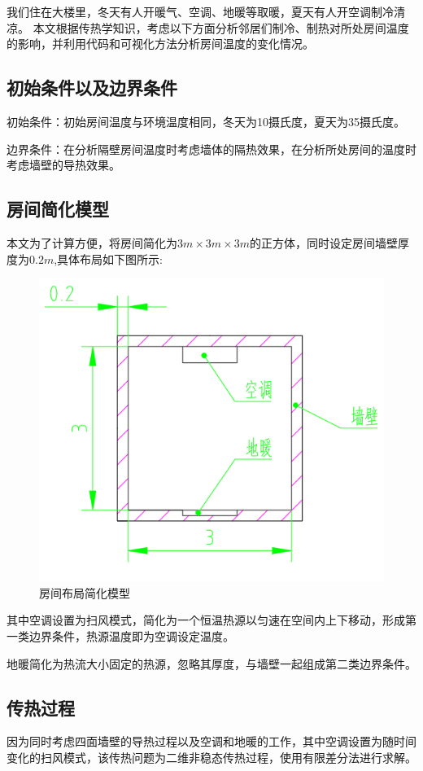 我们住在大楼里，冬天有人开暖气、空调、地暖等取暖，夏天有人开空调制冷清凉。
本文根据传热学知识，考虑以下方面分析邻居们制冷、制热对所处房间温度的影响，并利用代码和可视化方法分析房间温度的变化情况。

\subsection{初始条件以及边界条件}
初始条件：初始房间温度与环境温度相同，冬天为10摄氏度，夏天为35摄氏度。

边界条件：在分析隔壁房间温度时考虑墙体的隔热效果，在分析所处房间的温度时考虑墙壁的导热效果。

\subsection{房间简化模型}
本文为了计算方便，将房间简化为$3m\times3m\times3m$的正方体，同时设定房间墙壁厚度为$0.2m$,具体布局如下图所示:

\begin{figure}[h]
    \centering
    \includegraphics[scale = 0.5]{figures/房间模型.png}
    \caption{房间布局简化模型}
    \label{fig:Room}
\end{figure}

其中空调设置为扫风模式，简化为一个恒温热源以匀速在空间内上下移动，形成第一类边界条件，热源温度即为空调设定温度。

地暖简化为热流大小固定的热源，忽略其厚度，与墙壁一起组成第二类边界条件。

\subsection{传热过程}
因为同时考虑四面墙壁的导热过程以及空调和地暖的工作，其中空调设置为随时间变化的扫风模式，该传热问题为二维非稳态传热过程，使用有限差分法进行求解。


